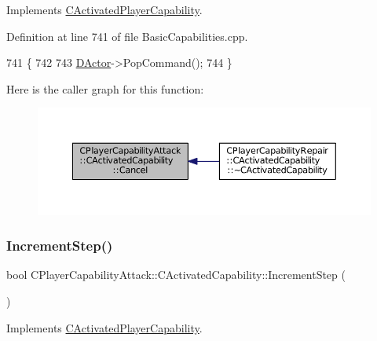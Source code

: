 Implements \hyperlink{classCActivatedPlayerCapability_a5cde83be468e262ad054d81e28684a81}{C\+Activated\+Player\+Capability}.



Definition at line 741 of file Basic\+Capabilities.\+cpp.


\begin{DoxyCode}
741                                                         \{
742 
743     \hyperlink{classCActivatedPlayerCapability_a54ca944b47bff2718330639941d402b0}{DActor}->PopCommand();
744 \}
\end{DoxyCode}
Here is the caller graph for this function\+:\nopagebreak
\begin{figure}[H]
\begin{center}
\leavevmode
\includegraphics[width=350pt]{classCPlayerCapabilityAttack_1_1CActivatedCapability_a0796fbda8a35b60a2320becfdf2b5c13_icgraph}
\end{center}
\end{figure}
\hypertarget{classCPlayerCapabilityAttack_1_1CActivatedCapability_a6b772cbd6be96fbd9bf88380b143856c}{}\label{classCPlayerCapabilityAttack_1_1CActivatedCapability_a6b772cbd6be96fbd9bf88380b143856c} 
\subsubsection{\texorpdfstring{Increment\+Step()}{IncrementStep()}}
{\footnotesize\ttfamily bool C\+Player\+Capability\+Attack\+::\+C\+Activated\+Capability\+::\+Increment\+Step (\begin{DoxyParamCaption}{ }\end{DoxyParamCaption})\hspace{0.3cm}{\ttfamily [virtual]}}



Implements \hyperlink{classCActivatedPlayerCapability_a943b5999a57504399293250382c0ec6a}{C\+Activated\+Player\+Capability}.




